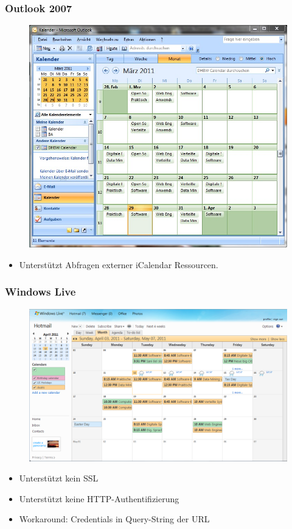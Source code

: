 \documentclass{beamer}
\begin{document}
\begin{frame}\frametitle{Outlook 2007}
  \begin{figure}
    \centering
    \includegraphics[height=0.6\paperheight]{images/dhbwcalendar-outlook2007.jpg}
  \end{figure}
  \begin{itemize}
    \item Unterstützt Abfragen externer iCalendar Ressourcen.
  \end{itemize}
\end{frame}

\begin{frame}\frametitle{Windows Live}
  \begin{figure}
    \centering
    \includegraphics[height=0.6\paperheight]{images/dhbwcalendar-live-web.png}
  \end{figure}
  \begin{itemize}
    \item Unterstützt kein SSL
    \item Unterstützt keine HTTP-Authentifizierung
    \item Workaround: Credentials in Query-String der URL
  \end{itemize}
\end{frame}
\end{document}

